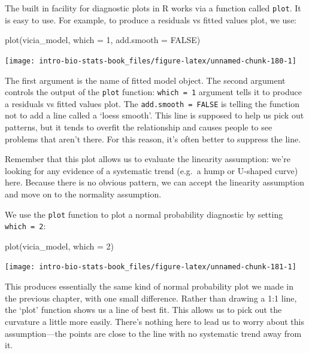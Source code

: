 \documentclass[
]{book}
\newenvironment{Shaded}{\begin{snugshade}}{\end{snugshade}}
\newcommand{\AttributeTok}[1]{\textcolor[rgb]{0.77,0.63,0.00}{#1}}
\newcommand{\ConstantTok}[1]{\textcolor[rgb]{0.00,0.00,0.00}{#1}}
\newcommand{\DecValTok}[1]{\textcolor[rgb]{0.00,0.00,0.81}{#1}}
\newcommand{\FunctionTok}[1]{\textcolor[rgb]{0.00,0.00,0.00}{#1}}
\newcommand{\NormalTok}[1]{#1}
\begin{document}
The built in facility for diagnostic plots in R works via a function called \texttt{plot}. It is easy to use. For example, to produce a residuals vs fitted values plot, we use:

\begin{Shaded}
\begin{Highlighting}[]
\FunctionTok{plot}\NormalTok{(vicia\_model, }\AttributeTok{which =} \DecValTok{1}\NormalTok{, }\AttributeTok{add.smooth =} \ConstantTok{FALSE}\NormalTok{)}
\end{Highlighting}
\end{Shaded}

\begin{center}\texttt{[image: intro-bio-stats-book\_files/figure-latex/unnamed-chunk-180-1]} \end{center}

The first argument is the name of fitted model object. The second argument controls the output of the \texttt{plot} function: \texttt{which\ =\ 1} argument tells it to produce a residuals vs fitted values plot. The \texttt{add.smooth\ =\ FALSE} is telling the function not to add a line called a `loess smooth'. This line is supposed to help us pick out patterns, but it tends to overfit the relationship and causes people to see problems that aren't there. For this reason, it's often better to suppress the line.

Remember that this plot allows us to evaluate the linearity assumption: we're looking for any evidence of a systematic trend (e.g.~a hump or U-shaped curve) here. Because there is no obvious pattern, we can accept the linearity assumption and move on to the normality assumption.

We use the \texttt{plot} function to plot a normal probability diagnostic by setting \texttt{which\ =\ 2}:

\begin{Shaded}
\begin{Highlighting}[]
\FunctionTok{plot}\NormalTok{(vicia\_model, }\AttributeTok{which =} \DecValTok{2}\NormalTok{)}
\end{Highlighting}
\end{Shaded}

\begin{center}\texttt{[image: intro-bio-stats-book\_files/figure-latex/unnamed-chunk-181-1]} \end{center}

This produces essentially the same kind of normal probability plot we made in the previous chapter, with one small difference. Rather than drawing a 1:1 line, the `plot' function shows us a line of best fit. This allows us to pick out the curvature a little more easily. There's nothing here to lead us to worry about this assumption---the points are close to the line with no systematic trend away from it.
\end{document}
